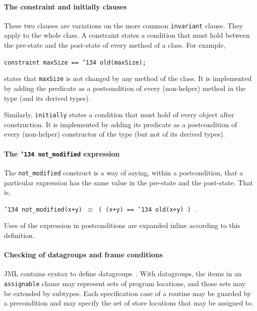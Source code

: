 \documentclass{llncs}
\begin{document}
\paragraph*{The constraint and initially clauses}
These two clauses are variations on the more common \texttt{invariant}
clause.  They apply to the whole class.  A constraint states a
condition that must hold between the pre-state and the post-state of
every method of a class.  For example,
\begin{center}
\texttt{constraint maxSize == \char'134 old(maxSize); }
\end{center}
states that \texttt{maxSize} is not changed by any method of the
class.  It is implemented by adding the predicate as a postcondition
of every (non-helper) method in the type (and its derived types).

Similarly, \texttt{initially} states a condition that must hold of
every object after construction.  It is implemented by adding its
predicate as a postcondition of every (non-helper) constructor of the
type (but not of its derived types).

\paragraph*{The \texttt{\char'134 not\_modified} expression}
The \texttt{not\_modified} construct is a way of saying, within a
postcondition, that a particular expression has the same value in the
pre-state and the post-state.  That is,
\begin{center}
\texttt{\char'134 not\_modified(x+y) $\equiv$ ( (x+y) == \char'134 old(x+y) )  }.
\end{center}
Uses of the expression in postconditions are expanded inline according
to this definition.

\paragraph*{Checking of datagroups and frame conditions}
JML contains syntax to define 
datagroups~\cite{Leino-Poetzsch-Heffter-Zhou02}.  With datagroups, the items in
an \texttt{assignable} clause may represent sets of program locations,
and those sets may be extended by subtypes.  Each
specification case of a routine may be guarded by a
precondition and may specify the set of store locations that may be
assigned to.
\end{document}
